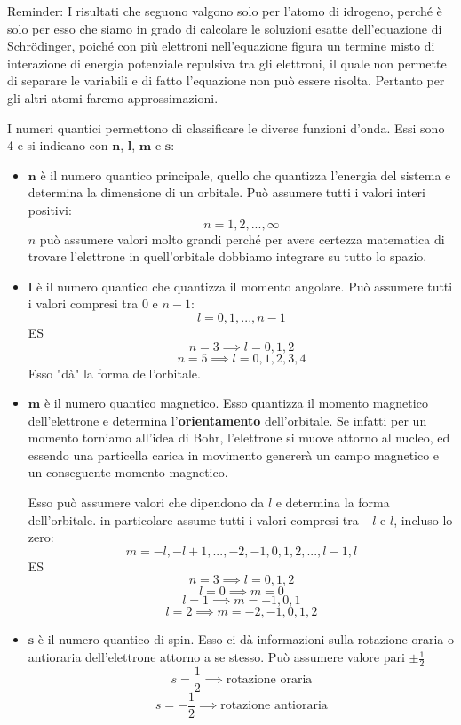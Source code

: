 Reminder: I risultati che seguono valgono solo per l'atomo di idrogeno, perché è solo per esso che siamo in grado di calcolare le soluzioni esatte dell'equazione di Schrödinger, poiché con più elettroni nell'equazione figura un termine misto di interazione di energia potenziale repulsiva tra gli elettroni, il quale non permette di separare le variabili e di fatto l'equazione non può essere risolta. Pertanto per gli altri atomi faremo approssimazioni.

I numeri quantici permettono di classificare le diverse funzioni d'onda. Essi sono 4 e si indicano con $\boldsymbol{n}$, $\boldsymbol{l}$, $\boldsymbol{m}$ e $\boldsymbol{s}$:
\begin{itemize}
  \item $\boldsymbol{n}$ è il numero quantico principale, quello che quantizza l'energia del sistema e determina la dimensione di un orbitale.
  Può assumere tutti i valori interi positivi:
  $${n=1,2,...,\infty}$$
  $n$ può assumere valori molto grandi perché per avere certezza matematica di trovare l'elettrone in quell'orbitale dobbiamo integrare su tutto lo spazio.
  \item $\boldsymbol{l}$ è il numero quantico che quantizza il momento angolare. Può assumere tutti i valori compresi tra 0 e $n-1$:
  $$l=0,1,...,n-1$$
  ES
  $$n=3 \implies l=0,1,2$$
  $$n=5 \implies l=0,1,2,3,4$$
  Esso "dà" la forma dell'orbitale.
  \item $\boldsymbol{m}$ è il numero quantico magnetico. Esso quantizza il momento magnetico dell'elettrone e determina l'\textbf{orientamento} dell'orbitale. Se infatti per un momento torniamo all'idea di Bohr, l'elettrone si muove attorno al nucleo, ed essendo una particella carica in movimento genererà un campo magnetico e un conseguente momento magnetico.
  
  Esso può assumere valori che dipendono da $l$ e determina la forma dell'orbitale. in particolare assume tutti i valori compresi tra $-l$ e $l$, incluso lo zero:
  $$m=-l,-l+1,...,-2,-1,0,1,2,...,l-1,l$$
  ES 
  $$n=3 \implies l=0,1,2$$
  $$l=0 \implies m=0$$
  $$l=1 \implies m=-1,0,1$$
  $$l=2 \implies m=-2,-1,0,1,2$$
  \item $\boldsymbol{s}$ è il numero quantico di spin. Esso ci dà informazioni sulla rotazione oraria o antioraria dell'elettrone attorno a se stesso. Può assumere valore pari $\pm\frac{1}{2}$
  $$s=\frac{1}{2}\implies \text{rotazione oraria}$$
  $$s=-\frac{1}{2}\implies \text{rotazione antioraria}$$
\end{itemize}

